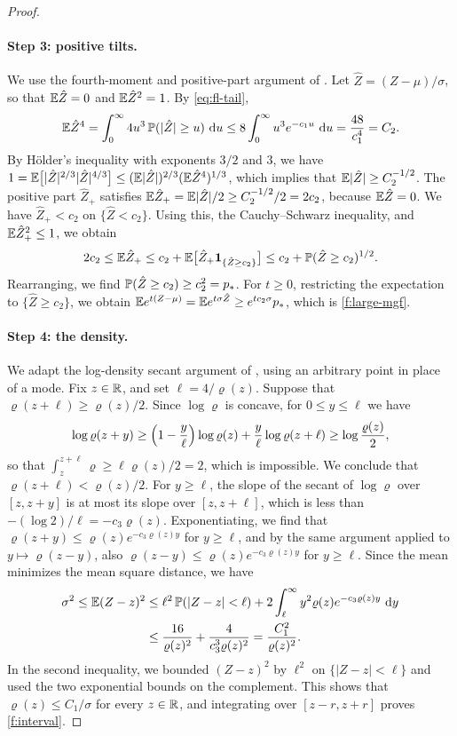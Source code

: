 \begin{proof}
\paragraph{Step 3: positive tilts.} We use the fourth-moment and positive-part argument of \cite[Lemma~7.7, proof]{oai-fluctuations}. Let $\hat Z=(Z-\mu)/\sigma$, so that $\mathbb E\hat Z=0$ and $\mathbb E\hat Z^2=1$. By \eqref{eq:fl-tail},
\[
 \mathbb E\hat Z^4=\int_0^\infty4u^3\,\mathbb P(|\hat Z|\ge u)\,\,\mathrm d u\le8\int_0^\infty u^3e^{-c_1u}\,\,\mathrm d u=\frac{48}{c_1^4}=C_2.
\]
By H\"older's inequality with exponents $3/2$ and $3$, we have $1=\mathbb E\bigl[|\hat Z|^{2/3}|\hat Z|^{4/3}\bigr]\le(\mathbb E|\hat Z|)^{2/3}(\mathbb E\hat Z^4)^{1/3}$, which implies that $\mathbb E|\hat Z|\ge C_2^{-1/2}$. The positive part $\hat Z_+$ satisfies $\mathbb E\hat Z_+=\mathbb E|\hat Z|/2\ge C_2^{-1/2}/2=2c_2$, because $\mathbb E\hat Z=0$. We have $\hat Z_+<c_2$ on $\{\hat Z<c_2\}$. Using this, the Cauchy--Schwarz inequality, and $\mathbb E\hat Z_+^2\le1$, we obtain
\[
 2c_2\le\mathbb E\hat Z_+\le c_2+\mathbb E\bigl[\hat Z_+\mathbf 1_{\{\hat Z\ge c_2\}}\bigr]\le c_2+\mathbb P(\hat Z\ge c_2)^{1/2}.
\]
Rearranging, we find $\mathbb P(\hat Z\ge c_2)\ge c_2^2=p_*$. For $t\ge0$, restricting the expectation to $\{\hat Z\ge c_2\}$, we obtain $\mathbb E e^{t(Z-\mu)}=\mathbb E e^{t\sigma\hat Z}\ge e^{tc_2\sigma}p_*$, which is \eqref{f:large-mgf}.

\paragraph{Step 4: the density.} We adapt the log-density secant argument of \cite[Lemma~7.7, proof]{oai-fluctuations}, using an arbitrary point in place of a mode. Fix $z\in\mathbb R$, and set $\ell=4/\varrho(z)$. Suppose that $\varrho(z+\ell)\ge\varrho(z)/2$. Since $\log\varrho$ is concave, for $0\le y\le\ell$ we have
\[
 \log\varrho(z+y)\ge\Bigl(1-\frac y\ell\Bigr)\log\varrho(z)+\frac y\ell\log\varrho(z+\ell)\ge\log\frac{\varrho(z)}2,
\]
so that $\int_z^{z+\ell}\varrho\ge\ell\varrho(z)/2=2$, which is impossible. We conclude that $\varrho(z+\ell)<\varrho(z)/2$. For $y\ge\ell$, the slope of the secant of $\log\varrho$ over $[z,z+y]$ is at most its slope over $[z,z+\ell]$, which is less than $-(\log2)/\ell=-c_3\varrho(z)$. Exponentiating, we find that $\varrho(z+y)\le\varrho(z)e^{-c_3\varrho(z)y}$ for $y\ge\ell$, and by the same argument applied to $y\mapsto\varrho(z-y)$, also $\varrho(z-y)\le\varrho(z)e^{-c_3\varrho(z)y}$ for $y\ge\ell$. Since the mean minimizes the mean square distance, we have
\[
\begin{aligned}
 \sigma^2\le\mathbb E(Z-z)^2&\le\ell^2\,\mathbb P(|Z-z|<\ell)+2\int_\ell^\infty y^2\varrho(z)e^{-c_3\varrho(z)y}\,\,\mathrm d y\\
 &\le\frac{16}{\varrho(z)^2}+\frac{4}{c_3^3\varrho(z)^2}=\frac{C_1^2}{\varrho(z)^2}.
\end{aligned}
\]
In the second inequality, we bounded $(Z-z)^2$ by $\ell^2$ on $\{|Z-z|<\ell\}$ and used the two exponential bounds on the complement. This shows that $\varrho(z)\le C_1/\sigma$ for every $z\in\mathbb R$, and integrating over $[z-r,z+r]$ proves \eqref{f:interval}.
\end{proof}

